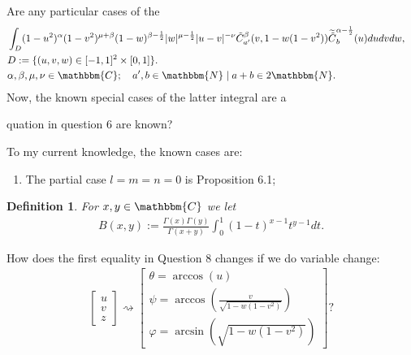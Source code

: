\documentclass{article}
\newcommand{\assign}{:=}
\newtheorem{definition}{Definition}
{\theorembodyfont{\rmfamily}\newtheorem{question}{Question}}
{\theorembodyfont{\rmfamily}\newtheorem{remark}{Remark}}
\begin{document}
\begin{question}
  Are any particular cases of the
  \begin{eqnarray}
    & \int_D (1 - u^2)^{\alpha} (1 - v^2)^{\mu + \beta} (1 - w)^{\beta -
    \frac{1}{2}} | w |^{\mu - \frac{1}{2}} | u - v |^{- \nu}
    \tilde{C}^{\beta}_{a'} (v, 1 - w (1 - v^2)) \widetilde{\tilde{C}}^{\alpha
    - \frac{1}{2}}_b (u) d u d v d w, &  \nonumber\\
    & D \assign \{ (u, v, w) \in [- 1, 1]^2 \times [0, 1] \} . &  \nonumber\\
    & \alpha, \beta, \mu, \nu \in \mathbbm{C}; \quad a', b \in \mathbbm{N}
    \mid a + b \in 2\mathbbm{N}. &  \nonumber
  \end{eqnarray}
  Now, the known special cases of the latter integral are a
  
  quation in question 6 are known?
\end{question}

To my current knowledge, the known cases are:
\begin{enumerate}
  \item The partial case $l = m = n = 0$ is Proposition 6.1;
\end{enumerate}
\begin{definition}
  For $x, y \in \mathbbm{C}$ we let
  \begin{eqnarray}
    & B (x, y) \assign \frac{\Gamma (x) \Gamma (y)}{\Gamma (x + y)} \int_0^1
    (1 - t)^{x - 1} t^{y - 1} d t. &  \nonumber
  \end{eqnarray}
\end{definition}

\begin{question}
  How does the first equality in Question 8 changes if we do variable change:
  \begin{eqnarray}
    & \left[ \begin{array}{c}
      u\\
      v\\
      z
    \end{array} \right] \rightsquigarrow \left[ \begin{array}{c}
      \theta = \arccos (u)\\
      \psi = \arccos \left( \frac{v}{\sqrt{1 - w (1 - v^2)}} \right)\\
      \varphi = \arcsin \left( \sqrt{1 - w (1 - v^2)} \right)
    \end{array} \right] ? &  \nonumber
  \end{eqnarray}
\end{question}
\end{document}
